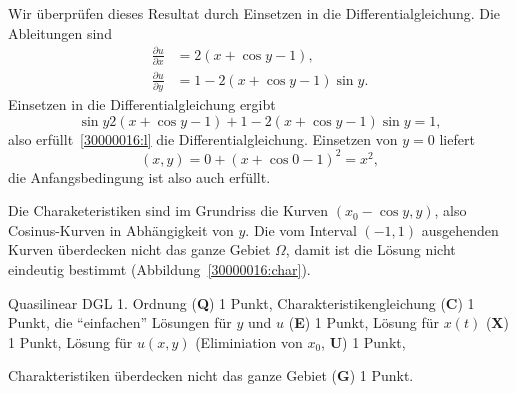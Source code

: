 \begin{loesung}
\begin{teilaufgaben}
Wir überprüfen dieses Resultat durch Einsetzen in die Differentialgleichung.
Die Ableitungen sind
\begin{align*}
\frac{\partial u}{\partial x}
&=
2(x+\cos y - 1),
\\
\frac{\partial u}{\partial y}
&=
1-2(x+\cos y - 1)\sin y.
\end{align*}
Einsetzen in die Differentialgleichung ergibt
\[
\sin y
2(x+\cos y - 1)
+
1-2(x+\cos y - 1)\sin y
=
1,
\]
also erfüllt~\eqref{30000016:l} die Differentialgleichung.
Einsetzen von $y=0$ liefert
\[
(x,y) = 0 + (x + \cos 0 - 1)^2 = x^2,
\]
die Anfangsbedingung ist also auch erfüllt.
\item
Die Charaketeristiken sind im Grundriss die Kurven $(x_0-\cos y,y)$, also
Cosinus-Kurven in Abhängigkeit von $y$.
Die vom Interval $(-1,1)$ ausgehenden Kurven überdecken nicht das ganze
Gebiet $\Omega$, damit ist die Lösung nicht eindeutig bestimmt
(Abbildung~\ref{30000016:char}).
\qedhere
\end{teilaufgaben}
\end{loesung}

\begin{bewertung}
\begin{teilaufgaben}
\item
Quasilinear DGL 1. Ordnung ({\bf Q}) 1 Punkt,
Charakteristikengleichung ({\bf C}) 1 Punkt,
die ``einfachen'' Lösungen für $y$ und $u$ ({\bf E}) 1 Punkt,
Lösung für $x(t)$ ({\bf X}) 1 Punkt,
Lösung für $u(x,y)$ (Eliminiation von $x_0$, {\bf U}) 1 Punkt,
\item
Charakteristiken überdecken nicht das ganze Gebiet ({\bf G}) 1 Punkt.
\end{teilaufgaben}
\end{bewertung}
